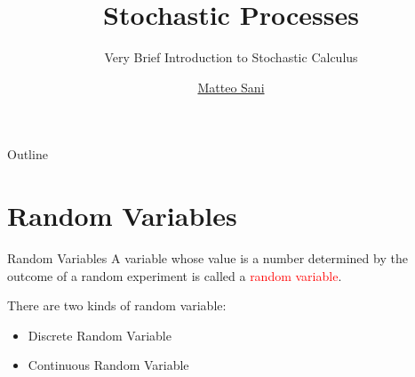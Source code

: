 \documentclass{beamer}
\title{Stochastic Processes}
\subtitle{Very Brief Introduction to Stochastic Calculus}
\author{\href{mailto:matteosan1@gmail.com}{Matteo Sani}}
\begin{document}
\begin{frame}[plain]
    \maketitle
\end{frame}



\begin{frame}{Outline}
	\tableofcontents
\end{frame}

\section{Random Variables}
\begin{frame}{Random Variables}
A variable whose value is a number determined by the outcome of a random experiment is called a \textcolor{red}{random variable}.
\newline

There are two kinds of random variable:
\begin{itemize}
	\item Discrete Random Variable
	\item Continuous Random Variable
\end{itemize}
\end{frame}
\end{document}
